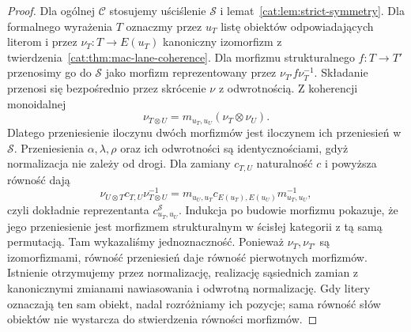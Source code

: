 \begin{proof}
Dla ogólnej $\mathcal C$ stosujemy uściślenie $\mathcal S$ i lemat~\ref{cat:lem:strict-symmetry}. Dla formalnego wyrażenia $T$ oznaczmy przez $u_T$ listę obiektów odpowiadających literom i przez $\nu_T:T\to E(u_T)$ kanoniczny izomorfizm z twierdzenia~\ref{cat:thm:mac-lane-coherence}. Dla morfizmu strukturalnego $f:T\to T'$ przenosimy go do $\mathcal S$ jako morfizm reprezentowany przez $\nu_{T'}f\nu_T^{-1}$. Składanie przenosi się bezpośrednio przez skrócenie $\nu$ z odwrotnością. Z koherencji monoidalnej
\[
\nu_{T\otimes U}=m_{u_T,u_U}(\nu_T\otimes\nu_U).
\]
Dlatego przeniesienie iloczynu dwóch morfizmów jest iloczynem ich przeniesień w $\mathcal S$. Przeniesienia $\alpha,\lambda,\rho$ oraz ich odwrotności są identycznościami, gdyż normalizacja nie zależy od drogi. Dla zamiany $c_{T,U}$ naturalność $c$ i powyższa równość dają
\[
\nu_{U\otimes T}c_{T,U}\nu_{T\otimes U}^{-1}
=m_{u_U,u_T}c_{E(u_T),E(u_U)}m_{u_T,u_U}^{-1},
\]
czyli dokładnie reprezentanta $c^{\mathcal S}_{u_T,u_U}$. Indukcja po budowie morfizmu pokazuje, że jego przeniesienie jest morfizmem strukturalnym w ścisłej kategorii z tą samą permutacją. Tam wykazaliśmy jednoznaczność. Ponieważ $\nu_T,\nu_{T'}$ są izomorfizmami, równość przeniesień daje równość pierwotnych morfizmów. Istnienie otrzymujemy przez normalizację, realizację sąsiednich zamian z kanonicznymi zmianami nawiasowania i odwrotną normalizację. Gdy litery oznaczają ten sam obiekt, nadal rozróżniamy ich pozycje; sama równość słów obiektów nie wystarcza do stwierdzenia równości morfizmów.
\end{proof}
